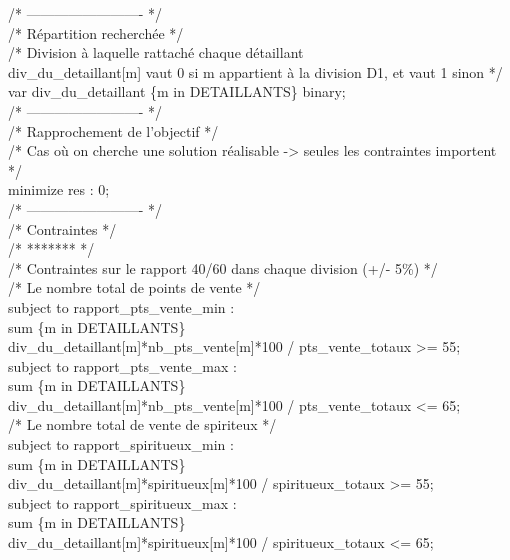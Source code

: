 \documentclass[a4paper,12pt,oneside]{report}
\begin{document}
/* ------------------------- */\\
/* Répartition recherchée */\\

/* Division à laquelle rattaché chaque détaillant\\
div\_du\_detaillant[m] vaut 0 si m appartient à la division D1, et vaut 1 sinon */\\
var div\_du\_detaillant \{m in DETAILLANTS\} binary;\\

/* ------------------------- */\\
/* Rapprochement de l'objectif */\\

/* Cas où on cherche une solution réalisable -> seules les contraintes importent */\\
minimize res : 0;\\


/* ------------------------- */\\
/* Contraintes */\\

/* ******* */\\
/* Contraintes sur le rapport 40/60 dans chaque division (+/- 5\%) */\\

/* Le nombre total de points de vente */\\
subject to rapport\_pts\_vente\_min :\\
	sum \{m in DETAILLANTS\}\\
	div\_du\_detaillant[m]*nb\_pts\_vente[m]*100 / pts\_vente\_totaux >= 55;\\

subject to rapport\_pts\_vente\_max :\\
	sum \{m in DETAILLANTS\}\\
	div\_du\_detaillant[m]*nb\_pts\_vente[m]*100 / pts\_vente\_totaux <= 65;\\

/* Le nombre total de vente de spiriteux */\\
subject to rapport\_spiritueux\_min :\\
	sum \{m in DETAILLANTS\}\\
	div\_du\_detaillant[m]*spiritueux[m]*100 / spiritueux\_totaux >= 55;\\

subject to rapport\_spiritueux\_max :\\
	sum \{m in DETAILLANTS\}\\
	div\_du\_detaillant[m]*spiritueux[m]*100 / spiritueux\_totaux <= 65;\\
\end{document}
